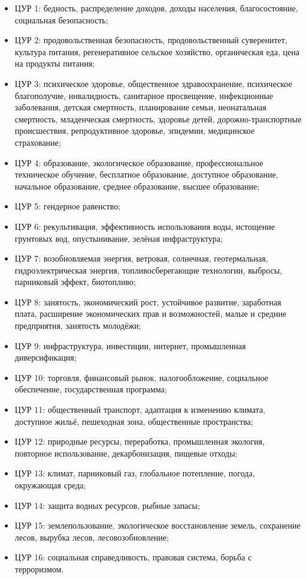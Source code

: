 \documentclass[master, och, coursework]{SCWorks1}
\begin{document}
\begin{itemize}
	\item ЦУР 1: бедность, распределение доходов, доходы населения, благосостояние, социальная безопасность;
	\item ЦУР 2: продовольственная безопасность, продовольственный суверенитет, культура питания, регенеративное сельское хозяйство, органическая еда, цена на продукты питания;
	\item ЦУР 3: психическое здоровье, общественное здравоохранение, психическое благополучие, инвалидность, санитарное просвещение, инфекционные заболевания, детская смертность, планирование семьи, неонатальная смертность, младенческая смертность, здоровье детей, дорожно-транспортные происшествия, репродуктивное здоровье, эпидемии, медицинское страхование;
	\item ЦУР 4: образование, экологическое образование, профессиональное техническое обучение, бесплатное образование, доступное образование, начальное образование, среднее образование, высшее образование;
	\item ЦУР 5: гендерное равенство;
	\item ЦУР 6: рекультивация, эффективность использования воды, истощение грунтовых вод, опустынивание, зелёная инфраструктура;
	\item ЦУР 7: возобновляемая энергия, ветровая, солнечная, геотермальная, гидроэлектрическая энергия, топливосберегающие технологии, выбросы, парниковый эффект, биотопливо;
	\item ЦУР 8: занятость, экономический рост, устойчивое развитие, заработная плата, расширение экономических прав и возможностей, малые и средние предприятия, занятость молодёжи;
	\item ЦУР 9: инфраструктура, инвестиции, интернет, промышленная диверсификация;
	\item ЦУР 10: торговля, финансовый рынок, налогообложение, социальное обеспечение, государственная программа;
	\item ЦУР 11: общественный транспорт, адаптация к изменению климата, доступное жильё, пешеходная зона, общественные пространства;
	\item ЦУР 12: природные ресурсы, переработка, промышленная экология, повторное использование, декарбонизация, пищевые отходы;
	\item ЦУР 13: климат, парниковый газ, глобальное потепление, погода, окружающая среда;
	\item ЦУР 14: защита водных ресурсов, рыбные запасы;
	\item ЦУР 15: землепользование, экологическое восстановление земель, сохранение лесов, вырубка лесов, лесовозобновление;
	\item ЦУР 16: социальная справедливость, правовая система, борьба с терроризмом.
\end{itemize}
\end{document}
